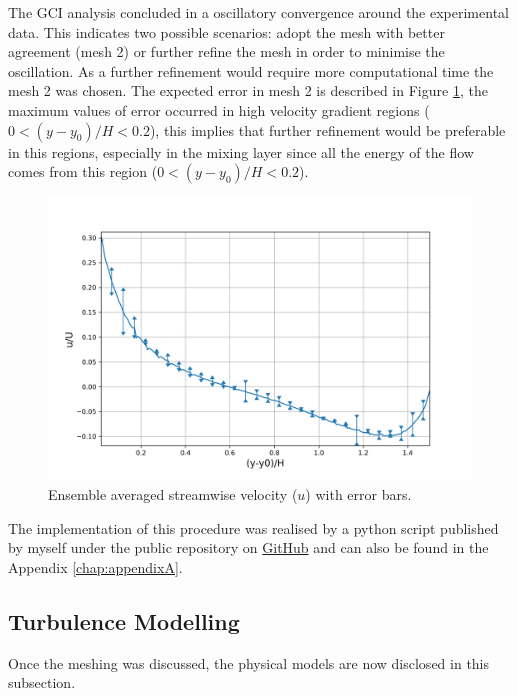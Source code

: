 \begin{refsection}
The GCI analysis concluded in a oscillatory convergence around the experimental data. This indicates two possible scenarios: adopt the mesh with better agreement (mesh 2) or further refine the mesh in order to minimise the oscillation. As a further refinement would require more computational time the mesh 2 was chosen. The expected error in mesh 2 is described in Figure \ref{fig:gciErrorbar}, the maximum values of error occurred in high velocity gradient regions ($0<(y-y_0)/H<0.2$), this implies that further refinement would be preferable in this regions, especially in the mixing layer since all the energy of the flow comes from this region ($0<(y-y_0)/H<0.2$).
\begin{figure}[!ht]
\centering
\includegraphics[width=\linewidth]{../images/methods/gciMediumWithErrorbars.png}
\caption{Ensemble averaged streamwise velocity ($u$) with error bars.}
\label{fig:gciErrorbar}
\end{figure}

The implementation of this procedure was realised by a python script published by myself under the public repository on \href{https://github.com/Worth-Option/gci}{GitHub} and can also be found in the Appendix \autoref{chap:appendixA}.

\subsection{Turbulence Modelling}
Once the meshing was discussed, the physical models are now disclosed in this subsection.


\end{refsection}
